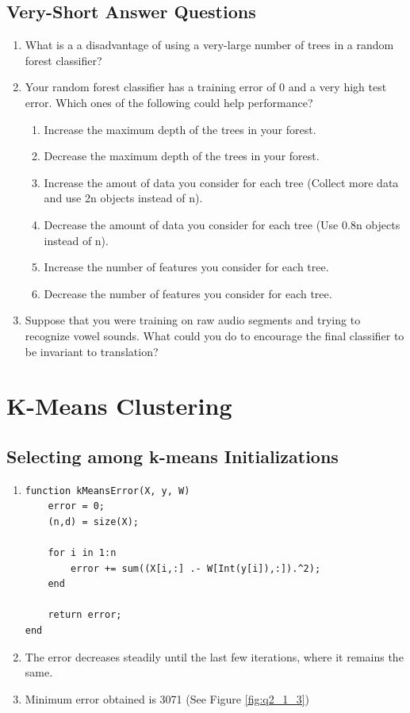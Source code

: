 \documentclass{article}
\def\blu#1{{\color{blu}#1}}
\def\enum#1{\begin{enumerate}#1\end{enumerate}}
\begin{document}
\subsection{Very-Short Answer Questions}

\blu{\enum{
\item What is a a disadvantage of using a very-large number of trees in a random forest classifier?
\item Your random forest classifier has a training error of 0 and a very high test error. Which ones of the following could help performance?
\enum{
\item Increase the maximum depth of the trees in your forest.
\item Decrease the maximum depth of the trees in your forest.
\item Increase the amout of data you consider for each tree (Collect more data and use 2n objects instead of n).
\item Decrease the amount of data you consider for each tree (Use 0.8n objects instead of n).
\item Increase the number of features you consider for each tree.
\item Decrease the number of features you consider for each tree.
}
\item Suppose that you were training on raw audio segments and trying to recognize vowel sounds. What could you do to encourage the final classifier to be invariant to translation?
}
}

\section{K-Means Clustering}

\subsection{Selecting among k-means Initializations}
 
\begin{enumerate}
 \item
\begin{verbatim}
function kMeansError(X, y, W)
    error = 0;
    (n,d) = size(X);

    for i in 1:n
        error += sum((X[i,:] .- W[Int(y[i]),:]).^2);
    end

    return error;
end
\end{verbatim}

 \item The error decreases steadily until the last few iterations, where it remains the same.
 \item Minimum error obtained is 3071 (See Figure \ref{fig:q2_1_3})
\end{enumerate}
 
\end{document}
